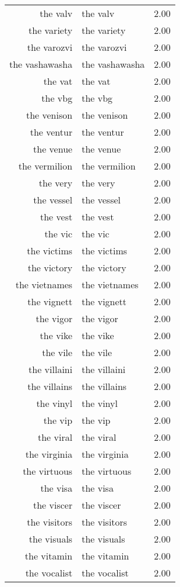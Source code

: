 \begin{table}[ht]
\begin{tabular}{rlr}
  the valv & the valv & 2.00 \\ 
  the variety & the variety & 2.00 \\ 
  the varozvi & the varozvi & 2.00 \\ 
  the vashawasha & the vashawasha & 2.00 \\ 
  the vat & the vat & 2.00 \\ 
  the vbg & the vbg & 2.00 \\ 
  the venison & the venison & 2.00 \\ 
  the ventur & the ventur & 2.00 \\ 
  the venue & the venue & 2.00 \\ 
  the vermilion & the vermilion & 2.00 \\ 
  the very & the very & 2.00 \\ 
  the vessel & the vessel & 2.00 \\ 
  the vest & the vest & 2.00 \\ 
  the vic & the vic & 2.00 \\ 
  the victims & the victims & 2.00 \\ 
  the victory & the victory & 2.00 \\ 
  the vietnames & the vietnames & 2.00 \\ 
  the vignett & the vignett & 2.00 \\ 
  the vigor & the vigor & 2.00 \\ 
  the vike & the vike & 2.00 \\ 
  the vile & the vile & 2.00 \\ 
  the villaini & the villaini & 2.00 \\ 
  the villains & the villains & 2.00 \\ 
  the vinyl & the vinyl & 2.00 \\ 
  the vip & the vip & 2.00 \\ 
  the viral & the viral & 2.00 \\ 
  the virginia & the virginia & 2.00 \\ 
  the virtuous & the virtuous & 2.00 \\ 
  the visa & the visa & 2.00 \\ 
  the viscer & the viscer & 2.00 \\ 
  the visitors & the visitors & 2.00 \\ 
  the visuals & the visuals & 2.00 \\ 
  the vitamin & the vitamin & 2.00 \\ 
  the vocalist & the vocalist & 2.00 \\ 

\end{tabular}
\end{table}
